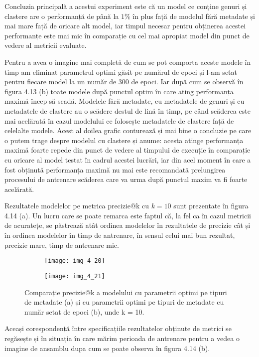 Concluzia principală a acestui experiment este că un model ce conține genuri și clastere are o performanță de până la $1\%$ în plus față de modelul fără metadate și mai mare față de oricare alt model, iar timpul necesar pentru obținerea acestei performanțe este mai mic în comparație cu cel mai apropiat model din punct de vedere al metricii evaluate.

Pentru a avea o imagine mai completă de cum se pot comporta aceste modele în timp am eliminat parametrul optimi găsit pe numărul de epoci și l-am setat pentru fiecare model la un număr de 300 de epoci. Iar după cum se observă în figura 4.13 (b) toate modele după punctul optim în care ating performanța maximă încep să scadă. Modelele fără metadate, cu metadatele de genuri și cu metadatele de clastere au o scădere destul de lină în timp, pe când scăderea este mai acelărată în cazul modelului ce folosește metadatele de clastere față de celelalte modele. 
Acest al doilea grafic conturează și mai bine o concluzie pe care o putem trage despre modelul cu clastere și anume: acesta atinge performanța maximă foarte repede din punct de vedere al timpului de execuție în comparație cu oricare al model testat în cadrul acestei lucrări, iar din acel moment în care a fost obținută performanța maximă nu mai este recomandată prelungirea procesului de antrenare scăderea care va urma după punctul maxim va fi foarte acelărată.

\vspace{5mm}
Rezultatele modelelor pe metrica precizie@k cu $k=10$ sunt prezentate în figura 4.14 (a). Un lucru care se poate remarca este faptul că, la fel ca în cazul metricii de acuratețe, se păstrează atât ordinea modelelor în rezultatele de precizie cât și în ordinea modelelor în timp de antrenare, în sensul celui mai bun rezultat, precizie mare, timp de antrenare mic.
\begin{figure}[!tbp]
  \begin{subfigure}[b]{0.5\textwidth}
    \texttt{[image: img\_4\_20]}
    \caption{}
    \label{fig:f1}
  \end{subfigure}
  \hfill
  \begin{subfigure}[b]{0.5\textwidth}
    \texttt{[image: img\_4\_21]}
    \caption{}
    \label{fig:f2}
  \end{subfigure}
  \caption[Comparație precizie@k a modelului cu parametrii optimi pe tipuri de metadate]{Comparație precizie@k a modelului cu parametrii optimi pe tipuri de metadate (a) și cu parametrii optimi pe tipuri de metadate cu număr setat de epoci (b), unde k = 10.}
\end{figure}
Aceași corespondență între specificațiile rezultatelor obținute de metrici se regăsește și în situația în care mărim perioada de antrenare pentru a vedea o imagine de ansamblu dupa cum se poate observa în figura 4.14 (b).

